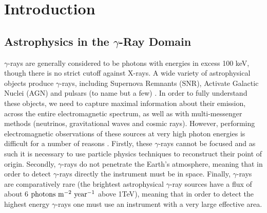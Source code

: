 \chapter{\label{ch:1-intro}Introduction} 
\minitoc
\section{Astrophysics in the \ensuremath{\gamma}-Ray Domain}
$\gamma$-rays are generally considered to be photons with energies in excess 100 keV, though there is no strict cutoff against X-rays. A wide variety of astrophysical objects produce $\gamma$-rays, including Supernova Remnants (SNR), Activate Galactic Nuclei (AGN) and pulsars (to name but a few) \cite{scienceCTA}. In order to fully understand these objects, we need to capture maximal information about their emission, across the entire electromagnetic spectrum, as well as with multi-messenger methods (neutrinos, gravitational waves and cosmic rays).  However, performing electromagnetic observations of these sources at very high photon energies is difficult for a number of reasons \cite{jamieiact}. Firstly, these $\gamma$-rays cannot be focused and as such it is necessary to use particle physics techniques to reconstruct their point of origin. Secondly, $\gamma$-rays do not penetrate the Earth's atmosphere, meaning that in order to detect $\gamma$-rays directly the instrument must be in space. Finally, $\gamma$-rays are comparatively rare (the brightest astrophysical $\gamma$-ray sources have a flux of about 6 $\rm{photons} \ \rm{m}^{-2}\ \rm{year}^{-1}$ above 1TeV\cite{jamieiact}), meaning that in order to detect the highest energy $\gamma$-rays one must use an instrument with a very large effective area.

